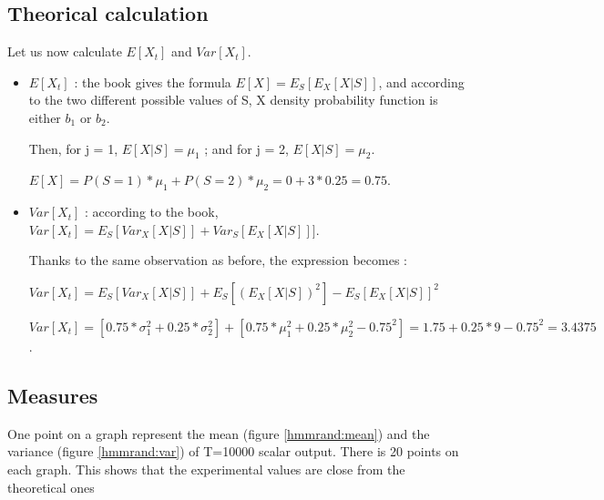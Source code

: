 \documentclass[a4paper]{report}
\begin{document}
\subsection{Theorical calculation}
Let us now calculate $E[X_{t}]$ and $Var[X_{t}]$.

\begin{itemize}
	\item 
	$E[X_{t}]$ : the book gives the formula $E[X]=E_{S}[E_{X}[X|S]]$, and according to the two different possible values of S, X density probability function is either $b_{1}$ or $b_{2}$.
	
	Then, for j = 1, $E[X|S]=\mu_{1}$ ;
	and for j = 2, $E[X|S]=\mu_{2}$.
	
	
	$E[X]=P(S=1)*\mu_{1} + P(S=2)*\mu_{2} = 0 + 3*0.25 = 0.75$.
	
\end{itemize}

\begin{itemize}
	\item $Var[X_{t}]$ : according to the book, $Var[X_{t}]=E_{S}[Var_{X}[X|S]] + Var_{S}[E_{X}[X|S]]]$.
	
	Thanks to the same observation as before, the expression becomes :
	
	$Var[X_{t}]=E_{S}[Var_{X}[X|S]] + E_{S}[(E_{X}[X|S])^2] - E_{S}[E_{X}[X|S] ]^2$
	
	$Var[X_{t}]=[0.75 * \sigma_{1}^2 + 0.25*\sigma_{2}^2] + [0.75*\mu_{1}^2+0.25*\mu_{2}^2 - 0.75^2] = 1.75+0.25*9-0.75^2=3.4375$.
\end{itemize}
\pagebreak
\subsection{Measures}
One point on a graph represent the mean (figure \ref{hmmrand:mean}) and the variance (figure  \ref{hmmrand:var}) of T=10000 scalar output. There is 20 points on each graph.  This shows that the experimental values are close from the theoretical ones
\end{document}
